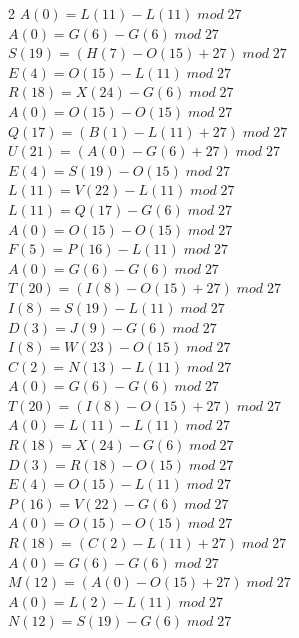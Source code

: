 \documentclass{article}
\begin{document}
\begin{enumerate}
\begin{multicols}{2}
$A (0) = L (11) - L (11) \;  mod \; 27$\\
$A (0) = G (6) - G (6) \;  mod \; 27$\\
$S (19) = (H (7) - O (15) + 27)  \;  mod \; 27$\\
$E (4) = O (15) - L (11) \;  mod \; 27$\\
$R (18) = X (24) - G (6) \;  mod \; 27$\\
$A (0) = O (15) - O (15) \;  mod \; 27$\\
$Q (17) = (B (1) - L (11) + 27) \;  mod \; 27$\\
$U (21) = (A (0) - G (6) + 27) \;  mod \; 27$\\
$E (4) = S (19) - O (15) \;  mod \; 27$\\
$L (11) = V (22) - L (11) \;  mod \; 27$\\
$L (11) = Q (17) - G (6) \;  mod \; 27$\\
$A (0) = O (15) - O (15) \;  mod \; 27$\\
$F (5) = P (16) - L (11) \;  mod \; 27$\\
$A (0) = G (6) - G (6) \;  mod \; 27$\\
$T (20) = (I (8) - O (15) + 27) \;  mod \; 27$\\
$I (8) = S (19) - L (11) \;  mod \; 27$\\
$D (3) = J (9) - G (6) \;  mod \; 27$\\
$I (8) = W (23) - O (15) \;  mod \; 27$\\
$C (2) = N (13) - L (11) \;  mod \; 27$\\
$A (0) = G (6) - G (6) \;  mod \; 27$\\
$T (20) = (I (8) - O (15) + 27) \;  mod \; 27$\\
$A (0) = L (11) - L (11) \;  mod \; 27$\\
$R (18) = X (24) - G (6) \;  mod \; 27$\\
$D (3) = R (18) - O (15) \;  mod \; 27$\\
$E (4) = O (15) - L (11) \;  mod \; 27$\\
$P (16) = V (22) - G (6) \;  mod \; 27$\\
$A (0) = O (15) - O (15) \;  mod \; 27$\\
$R (18) = (C (2) - L (11) +27)  \;  mod \; 27$\\
$A (0) = G (6) - G (6) \;  mod \; 27$\\
$M (12) = (A (0) - O (15) + 27) \;  mod \; 27$\\
$A (0) = L (2) - L (11)   \;  mod \; 27$\\
$N (12) = S (19) - G (6) \;  mod \; 27$\\

\end{multicols}
\end{enumerate}
\end{document}
